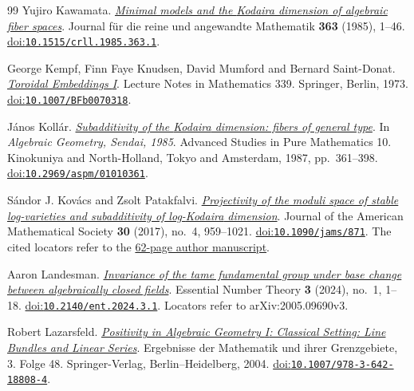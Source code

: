 \begin{thebibliography}{99}
Yujiro Kawamata.
\emph{\href{https://doi.org/10.1515/crll.1985.363.1}{Minimal models and the {Kodaira} dimension of algebraic fiber spaces}}.
Journal f{\"u}r die reine und angewandte Mathematik \textbf{363} (1985), 1--46.
\href{https://doi.org/10.1515/crll.1985.363.1}{doi:\nolinkurl{10.1515/crll.1985.363.1}}.

George Kempf, Finn Faye Knudsen, David Mumford and Bernard Saint-Donat.
\emph{\href{https://doi.org/10.1007/BFb0070318}{Toroidal Embeddings {I}}}.
Lecture Notes in Mathematics 339.
Springer, Berlin, 1973.
\href{https://doi.org/10.1007/BFb0070318}{doi:\nolinkurl{10.1007/BFb0070318}}.

J{\'a}nos Koll{\'a}r.
\emph{\href{https://doi.org/10.2969/aspm/01010361}{Subadditivity of the {Kodaira} dimension: fibers of general type}}.
In \emph{Algebraic Geometry, Sendai, 1985}.
Advanced Studies in Pure Mathematics 10.
Kinokuniya and North-Holland, Tokyo and Amsterdam, 1987, pp.~361--398.
\href{https://doi.org/10.2969/aspm/01010361}{doi:\nolinkurl{10.2969/aspm/01010361}}.

S{\'a}ndor J. Kov{\'a}cs and Zsolt Patakfalvi.
\emph{\href{https://sites.math.washington.edu/~kovacs/current/papers/Kovacs_Patakfalvi__Projectivity.pdf}{Projectivity of the moduli space of stable log-varieties and subadditivity of log-{Kodaira} dimension}}.
Journal of the American Mathematical Society \textbf{30} (2017), no.~4, 959--1021.
\href{https://doi.org/10.1090/jams/871}{doi:\nolinkurl{10.1090/jams/871}}.
The cited locators refer to the \href{https://sites.math.washington.edu/~kovacs/current/papers/Kovacs_Patakfalvi__Projectivity.pdf}{62-page author manuscript}.

Aaron Landesman.
\emph{\href{https://arxiv.org/abs/2005.09690v3}{Invariance of the tame fundamental group under base change between algebraically closed fields}}.
Essential Number Theory \textbf{3} (2024), no.~1, 1--18.
\href{https://doi.org/10.2140/ent.2024.3.1}{doi:\nolinkurl{10.2140/ent.2024.3.1}}.
Locators refer to arXiv:2005.09690v3.

Robert Lazarsfeld.
\emph{\href{https://link.springer.com/book/10.1007/978-3-642-18808-4}{Positivity in Algebraic Geometry {I}: Classical Setting: Line Bundles and Linear Series}}.
Ergebnisse der Mathematik und ihrer Grenzgebiete, 3. Folge 48.
Springer-Verlag, Berlin--Heidelberg, 2004.
\href{https://doi.org/10.1007/978-3-642-18808-4}{doi:\nolinkurl{10.1007/978-3-642-18808-4}}.


\end{thebibliography}

